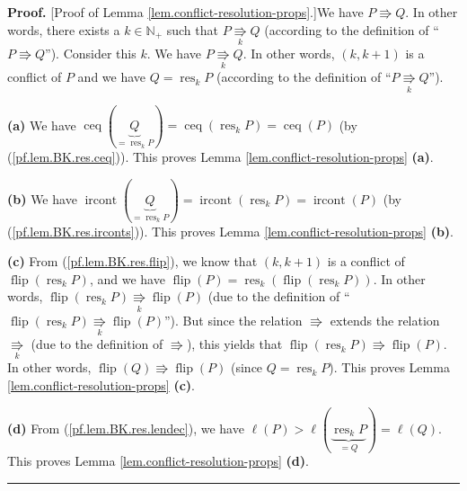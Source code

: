 \documentclass[numbers=enddot,12pt,final,onecolumn,notitlepage]{scrartcl}%
\theoremstyle{definition}
\newenvironment{proof}[1][Proof]{\noindent\textbf{#1.} }{\ \rule{0.5em}{0.5em}}
\newenvironment{verlong}{}{}
\begin{document}
\begin{verlong}
\begin{proof}
[Proof of Lemma \ref{lem.conflict-resolution-props}.]We have $P\Rrightarrow
Q$. In other words, there exists a $k\in\mathbb{N}_{+}$ such that
$P\underset{k}{\Rrightarrow}Q$ (according to the definition of
\textquotedblleft$P\Rrightarrow Q$\textquotedblright). Consider this $k$. We
have $P\underset{k}{\Rrightarrow}Q$. In other words, $\left(  k,k+1\right)  $
is a conflict of $P$ and we have $Q=\operatorname*{res}\nolimits_{k}P$
(according to the definition of \textquotedblleft$P\underset{k}{\Rrightarrow
}Q$\textquotedblright).

\textbf{(a)} We have $\operatorname*{ceq}\left(  \underbrace{Q}%
_{=\operatorname*{res}\nolimits_{k}P}\right)  =\operatorname*{ceq}\left(
\operatorname*{res}\nolimits_{k}P\right)  =\operatorname*{ceq}\left(
P\right)  $ (by (\ref{pf.lem.BK.res.ceq})). This proves Lemma
\ref{lem.conflict-resolution-props} \textbf{(a)}.

\textbf{(b)} We have $\operatorname*{ircont}\left(  \underbrace{Q}%
_{=\operatorname*{res}\nolimits_{k}P}\right)  =\operatorname*{ircont}\left(
\operatorname*{res}\nolimits_{k}P\right)  =\operatorname*{ircont}\left(
P\right)  $ (by (\ref{pf.lem.BK.res.irconts})). This proves Lemma
\ref{lem.conflict-resolution-props} \textbf{(b)}.

\textbf{(c)} From (\ref{pf.lem.BK.res.flip}), we know that $\left(
k,k+1\right)  $ is a conflict of $\operatorname*{flip}\left(
\operatorname*{res}\nolimits_{k}P\right)  $, and we have $\operatorname*{flip}%
\left(  P\right)  =\operatorname*{res}\nolimits_{k}\left(
\operatorname*{flip}\left(  \operatorname*{res}\nolimits_{k}P\right)  \right)
$. In other words, $\operatorname*{flip}\left(  \operatorname*{res}%
\nolimits_{k}P\right)  \underset{k}{\Rrightarrow}\operatorname*{flip}\left(
P\right)  $ (due to the definition of \textquotedblleft$\operatorname*{flip}%
\left(  \operatorname*{res}\nolimits_{k}P\right)  \underset{k}{\Rrightarrow
}\operatorname*{flip}\left(  P\right)  $\textquotedblright). But since the
relation $\Rrightarrow$ extends the relation $\underset{k}{\Rrightarrow}$ (due
to the definition of $\Rrightarrow$), this yields that $\operatorname*{flip}%
\left(  \operatorname*{res}\nolimits_{k}P\right)  \Rrightarrow
\operatorname*{flip}\left(  P\right)  $. In other words, $\operatorname*{flip}%
\left(  Q\right)  \Rrightarrow\operatorname*{flip}\left(  P\right)  $ (since
$Q=\operatorname*{res}\nolimits_{k}P$). This proves Lemma
\ref{lem.conflict-resolution-props} \textbf{(c)}.

\textbf{(d)} From (\ref{pf.lem.BK.res.lendec}), we have $\ell\left(  P\right)
>\ell\left(  \underbrace{\operatorname*{res}\nolimits_{k}P}_{=Q}\right)
=\ell\left(  Q\right)  $. This proves Lemma
\ref{lem.conflict-resolution-props} \textbf{(d)}.
\end{proof}
\end{verlong}
\end{document}
